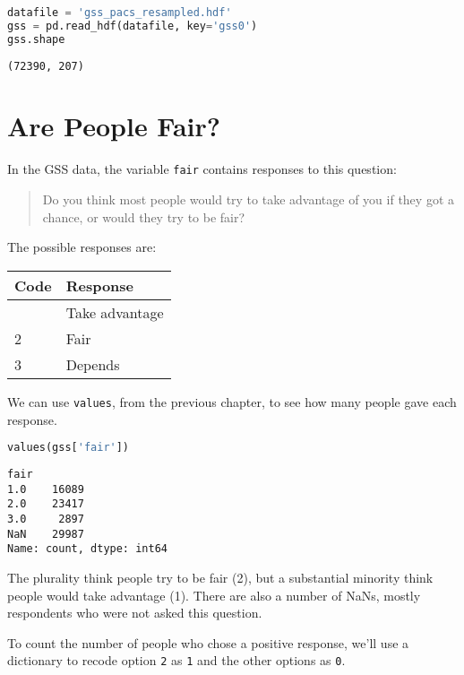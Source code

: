 \begin{lstlisting}[language=Python,style=source]
datafile = 'gss_pacs_resampled.hdf'
gss = pd.read_hdf(datafile, key='gss0')
gss.shape
\end{lstlisting}

\begin{lstlisting}[style=output]
(72390, 207)
\end{lstlisting}

\section{Are People Fair?}\label{are-people-fair}

In the GSS data, the variable \passthrough{\lstinline!fair!} contains
responses to this question:

\begin{quote}
Do you think most people would try to take advantage of you if they got
a chance, or would they try to be fair?
\end{quote}

The possible responses are:

\begin{longtable}[]{ll}
\midrule
Code & Response \\
\midrule
\endhead
\midrule
\endlastfoot
1 & Take advantage \\
2 & Fair \\
3 & Depends \\
\end{longtable}

We can use \passthrough{\lstinline!values!}, from the previous chapter,
to see how many people gave each response.

\begin{lstlisting}[language=Python,style=source]
values(gss['fair'])
\end{lstlisting}

\begin{lstlisting}[style=output]
fair
1.0    16089
2.0    23417
3.0     2897
NaN    29987
Name: count, dtype: int64
\end{lstlisting}

The plurality think people try to be fair (2), but a substantial
minority think people would take advantage (1). There are also a number
of NaNs, mostly respondents who were not asked this question.

To count the number of people who chose a positive response, we'll use a
dictionary to recode option \passthrough{\lstinline!2!} as
\passthrough{\lstinline!1!} and the other options as
\passthrough{\lstinline!0!}.

